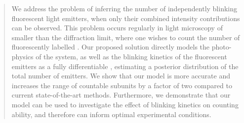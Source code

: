 \begin{abstract}

  We address the problem of inferring the number of independently blinking
  fluorescent light emitters, when only their combined intensity contributions
  can be observed.
  This problem occurs regularly in light microscopy of \objects 
  smaller than the diffraction limit, where one wishes to count the number of
  fluorescently labelled \smallobjects.
  Our proposed solution directly models the photo-physics of the system, as
  well as the blinking kinetics of the fluorescent emitters as a fully
  differentiable \hmm, 
  estimating a posterior distribution of the total number of emitters.
  We show that our model is more accurate and increases the range of 
  countable subunits by a factor of two compared to current state-of-the-art methods.
  Furthermore, we demonstrate that our model can be used to investigate the
  effect of blinking kinetics on counting ability, and therefore can inform optimal 
  experimental conditions.



\end{abstract}

